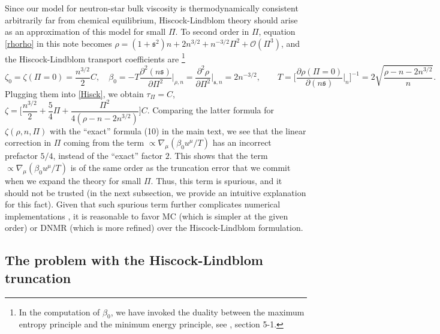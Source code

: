 \documentclass[aps,prl,noshowpacs,noshowkeys,floatfix,superscriptaddress,singlecolum,nofootinbib]{revtex4-2}
\theoremstyle{definition}
\theoremstyle{theorem}
\begin{document}
Since our model for neutron-star bulk viscosity is thermodynamically consistent arbitrarily far from chemical equilibrium, Hiscock-Lindblom theory should arise as an approximation of this model for small $\Pi$. To second order in $\Pi$, equation \eqref{rhorho} in this note becomes
$\rho = (1+\mathfrak{s}^2)n+2n^{3/2}+n^{-3/2}\Pi^2 +\mathcal{O}(\Pi^3)$,
and the Hiscock-Lindblom transport coefficients are \footnote{In the computation of $\beta_0$, we have invoked the duality between the maximum entropy principle and the minimum energy principle, see \citet{Callen_book}, section 5-1.}
\begin{equation}
    \zeta_0= \zeta(\Pi=0)= \dfrac{n^{3/2}}{2}C , \quad
\beta_0= -T \dfrac{\partial^2 (n\mathfrak{s})}{\partial \Pi^2}\bigg|_{\rho,n}=\dfrac{\partial^2 \rho}{\partial \Pi^2}\bigg|_{\mathfrak{s},n} = 2n^{-3/2}, \qquad
T= \bigg[\dfrac{\partial \rho(\Pi=0)}{\partial (n \mathfrak{s})}\bigg|_{n}\bigg]^{-1}=2\sqrt{\dfrac{\rho-n-2n^{3/2}}{n}}. 
\end{equation}
Plugging them into \eqref{Hisck}, we obtain
    $\tau_\Pi = C$, 
    $\zeta= \bigg[\dfrac{n^{3/2}}{2} +\dfrac{5}{4}\Pi + \dfrac{\Pi^2}{4(\rho-n-2n^{3/2})} \bigg]C$.
Comparing the latter formula for $\zeta(\rho,n,\Pi)$ with the ``exact'' formula (10) in the main text, we see that the linear correction in $\Pi$ coming from the term $\propto \nabla_\mu (\beta_0 u^\mu/T)$ has an incorrect prefactor $5/4$, instead of the ``exact'' factor $2$. This shows that the term $\propto \nabla_\mu (\beta_0 u^\mu/T)$ is of the same order as the truncation error that we commit when we expand the theory for small $\Pi$. Thus, this term is spurious, and it should not be trusted (in the next subsection, we provide an intuitive explanation for this fact). Given that such spurious term further complicates numerical implementations \cite{CamelioSimulations2022}, it is reasonable to favor MC (which is simpler at the given order) or DNMR (which is more refined) over the Hiscock-Lindblom formulation. 


\subsection*{The problem with the Hiscock-Lindblom truncation}
\end{document}
